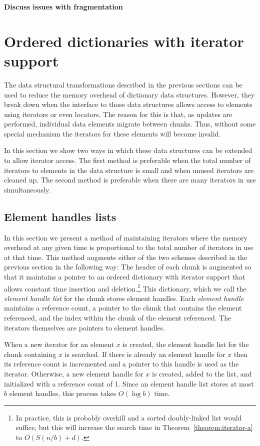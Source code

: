 \documentclass{DIKU-article}
\newcommand{\thmref}[1]{Theorem~\ref{theorem:#1}}
\newcommand{\seclabel}[1]{\label{sec:#1}}
\begin{document}
\noindent\textbf{Discuss issues with fragmentation}

\section{Ordered dictionaries with iterator support}
\seclabel{iterator-dictionaries}

The data structural transformations described in the previous sections
can be used to reduce the memory overhead of dictionary data
structures.  However, they break down when the interface to those data
structures allows access to elements using iterators or even locators.
The reason for this is that, as updates are performed, individual data
elements migrate between chunks.  Thus, without some special mechanism
the iterators for these elements will become invalid.

In this section we show two ways in which these data structures can be
extended to allow iterator access.  The first method is preferable
when the total number of iterators to elements in the data structure
is small and when unused iterators are cleaned up. The second method
is preferable when there are many iterators in use simultaneously. 

\subsection{Element handles lists}

In this section we present a method of maintaining iterators where the
memory overhead at any given time is proportional to the total number
of iterators in use at that time.  This method augments either of the
two schemes described in the previous section in the following way:
The header of each chunk is augmented so that it maintains a pointer
to an ordered dictionary with iterator support that allows constant
time insertion and deletion.\footnote{In practice, this is probably
overkill and a sorted doubly-linked list would suffice, but this will
increase the search time in \thmref{iterator-a} to $O(S(n/b)+d)$.}
This dictionary, which we call the \emph{element handle list} for the
chunk stores element handles. Each \emph{element handle} maintains a
reference count, a pointer to the chunk that contains the element
referenced, and the index within the chunk of the element referenced.
The iterators themselves are pointers to element handles.

When a new iterator for an element $x$ is created, the element handle
list for the chunk containing $x$ is searched.  If there is already an
element handle for $x$ then its reference count is incremented and a
pointer to this handle is used as the iterator.  Otherwise, a new
element handle for $x$ is created, added to the list, and initialized
with a reference count of 1.  Since an element handle list stores at
most $b$ element handles, this process takes $O(\log b)$ time.
\end{document}
